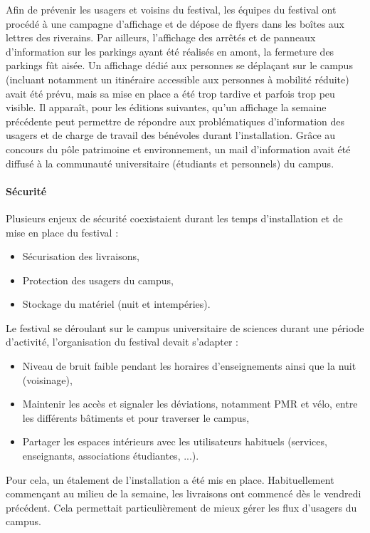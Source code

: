 \documentclass[12pt,a4paper]{report}
\begin{document}
Afin de prévenir les usagers et voisins du festival, les équipes du festival ont procédé à une campagne d'affichage et de dépose de flyers dans les boîtes aux lettres des riverains. Par ailleurs, l'affichage des arrêtés et de panneaux d'information sur les parkings ayant été réalisés en amont, la fermeture des parkings fût aisée. Un affichage dédié aux personnes se déplaçant sur le campus (incluant notamment un itinéraire accessible aux personnes à mobilité réduite) avait été prévu, mais sa mise en place a été trop tardive et parfois trop peu visible. Il apparaît, pour les éditions suivantes, qu'un affichage la semaine précédente peut permettre de répondre aux problématiques d'information des usagers et de charge de travail des bénévoles durant l'installation. Grâce au concours du pôle patrimoine et environnement, un mail d'information avait été diffusé à la communauté universitaire (étudiants et personnels) du campus.

\paragraph{Sécurité}

Plusieurs enjeux de sécurité coexistaient durant les temps d'installation et de mise en place du festival : 
\begin{itemize}
\item Sécurisation des livraisons,
\item Protection des usagers du campus,
\item Stockage du matériel (nuit et intempéries).\\
\end{itemize}

Le festival se déroulant sur le campus universitaire de sciences durant une période d'activité, l'organisation du festival devait s'adapter : 
\begin{itemize}
\item Niveau de bruit faible pendant les horaires d'enseignements ainsi que la nuit (voisinage),
\item Maintenir les accès et signaler les déviations, notamment PMR et vélo, entre les différents bâtiments et pour traverser le campus,
\item Partager les espaces intérieurs avec les utilisateurs habituels (services, enseignants, associations étudiantes, ...).\\
\end{itemize}

Pour cela, un étalement de l'installation a été mis en place. Habituellement commençant au milieu de la semaine, les livraisons ont commencé dès le vendredi précédent. Cela permettait particulièrement de mieux gérer les flux d'usagers du campus.\\
\end{document}
